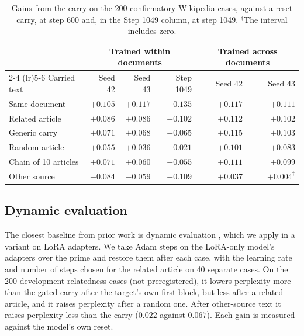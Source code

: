\documentclass[10pt]{article} %
\begin{document}
\begin{table}[H]
  \centering
  \small
  \begin{tabular}{lrrrrr}
    \toprule
    & \multicolumn{3}{c}{Trained within documents} & \multicolumn{2}{c}{Trained across documents} \\
    \cmidrule(lr){2-4} \cmidrule(lr){5-6}
    Carried text & Seed 42 & Seed 43 & Step 1049 & Seed 42 & Seed 43 \\
    \midrule
    Same document & $+0.105$ & $+0.117$ & $+0.135$ & $+0.117$ & $+0.111$ \\
    Related article & $+0.086$ & $+0.086$ & $+0.102$ & $+0.112$ & $+0.102$ \\
    Generic carry & $+0.071$ & $+0.068$ & $+0.065$ & $+0.115$ & $+0.103$ \\
    Random article & $+0.055$ & $+0.036$ & $+0.021$ & $+0.101$ & $+0.083$ \\
    Chain of 10 articles & $+0.071$ & $+0.060$ & $+0.055$ & $+0.111$ & $+0.099$ \\
    Other source & $-0.084$ & $-0.059$ & $-0.109$ & $+0.037$ & $+0.004^{\dagger}$ \\
    \bottomrule
  \end{tabular}
    \caption{Gains from the carry on the 200 confirmatory Wikipedia cases, against a reset carry, at step 600 and, in the Step 1049 column, at step 1049. $^{\dagger}$The interval includes zero.}
  \label{tab-conf}
\end{table}

\subsection{Dynamic evaluation}
\label{app-dyneval}

The closest baseline from prior work is dynamic evaluation \citep{krause2018dynamic,krause2019dynamic}, which we apply in a variant on LoRA adapters. We take Adam \citep{kingma2015adam} steps on the LoRA-only model's adapters over the prime and restore them after each case, with the learning rate and number of steps chosen for the related article on 40 separate cases. On the 200 development relatedness cases (not preregistered), it lowers perplexity more than the gated carry after the target's own first block, but less after a related article, and it raises perplexity after a random one. After other-source text it raises perplexity less than the carry ($0.022$ against $0.067$). Each gain is measured against the model's own reset.
\end{document}
